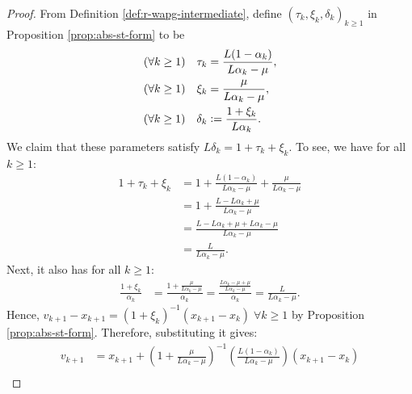 \documentclass[12pt]{article}
\begin{document}
        \begin{proof}
            From Definition \ref{def:r-wapg-intermediate}, define $(\tau_k, \xi_k, \delta_k)_{k \ge 1}$ in Proposition \ref{prop:abs-st-form} to be
            \begin{align*}
                (\forall k \ge 1) \quad \tau_k &= \frac{L(1 - \alpha_k)}{L\alpha_k - \mu},
                \\
                (\forall k \ge 1)\quad 
                \xi_k &= \frac{\mu}{L \alpha_k - \mu},
                \\
                (\forall k \ge 1)\quad 
                \delta_k &\vcentcolon= \frac{1 + \xi_k}{L\alpha_k}. 
            \end{align*}
            We claim that these parameters satisfy $L\delta_k = 1 + \tau_k + \xi_k$. 
            To see, we have for all $k\ge 1$: 
            \begin{align*}
                1 + \tau_k + \xi_k &= 
                1 + \frac{L(1 - \alpha_k)}{L \alpha_k - \mu} 
                + \frac{\mu}{L \alpha_k - \mu}
                \\
                &= 
                1 + \frac{L - L \alpha_k + \mu}{L\alpha_k - \mu}
                \\
                &= 
                \frac{L - L \alpha_k + \mu + L \alpha_k - \mu}{L\alpha_k - \mu}
                \\
                &= \frac{L}{L\alpha_k - \mu}. 
            \end{align*}
            Next, it also has for all $k \ge 1$: 
            \begin{align*}
                \frac{1 + \xi_k}{\alpha_k}
                &= 
                \frac{1 + \frac{\mu}{L\alpha_k - \mu}}{\alpha_k}
                = 
                \frac{\frac{L\alpha_k - \mu + \mu}{L \alpha_k - \mu}}{\alpha_k}
                = 
                \frac{L}{L\alpha_k - \mu}.
            \end{align*}
            Hence,  $v_{k + 1} - x_{k + 1} = (1 + \xi_k)^{-1}(x_{k + 1} - x_k)\; \forall k \ge 1$ by Proposition \ref{prop:abs-st-form}.
            Therefore, substituting it gives: 
            \begin{align*}
                v_{k + 1} &= 
                x_{k + 1} + \left(
                    1 + \frac{\mu}{L\alpha_k - \mu}
                \right)^{-1}\left(
                    \frac{L(1 - \alpha_k)}{L\alpha_k - \mu}
                \right)(x_{k + 1} - x_k)
                \\

\end{align*}
\end{proof}
\end{document}
